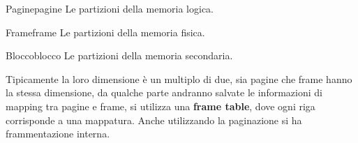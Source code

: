 \documentclass[12pt]{article}
\begin{document}
\begin{definition}{Pagine}{pagine}
  Le partizioni della memoria logica.
\end{definition}
\begin{definition}{Frame}{frame}
  Le partizioni della memoria fisica.
\end{definition}
\begin{definition}{Blocco}{blocco}
  Le partizioni della memoria secondaria.
\end{definition}
Tipicamente la loro dimensione \`e un multiplo di due, sia pagine che frame hanno la stessa dimensione, da qualche parte andranno salvate le informazioni di mapping tra pagine e frame, si utilizza una \textbf{frame table}, dove ogni riga corrisponde a una mappatura. Anche utilizzando la paginazione si ha frammentazione interna. 

\hfill
\end{document}
